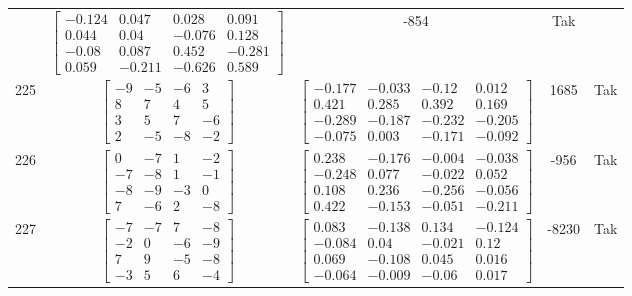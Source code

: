\documentclass[a4paper,12pt]{article}
\begin{document}
\begin{tabular}{c c c c c}
&
$\begin{bmatrix} -0.124 & 0.047 & 0.028 & 0.091 \\ 0.044 & 0.04 & -0.076 & 0.128 \\ -0.08 & 0.087 & 0.452 & -0.281 \\ 0.059 & -0.211 & -0.626 & 0.589 \end{bmatrix}$
&
-854
&
Tak
\\
225
&
$\begin{bmatrix} -9 & -5 & -6 & 3 \\ 8 & 7 & 4 & 5 \\ 3 & 5 & 7 & -6 \\ 2 & -5 & -8 & -2 \end{bmatrix}$
&
$\begin{bmatrix} -0.177 & -0.033 & -0.12 & 0.012 \\ 0.421 & 0.285 & 0.392 & 0.169 \\ -0.289 & -0.187 & -0.232 & -0.205 \\ -0.075 & 0.003 & -0.171 & -0.092 \end{bmatrix}$
&
1685
&
Tak
\\
226
&
$\begin{bmatrix} 0 & -7 & 1 & -2 \\ -7 & -8 & 1 & -1 \\ -8 & -9 & -3 & 0 \\ 7 & -6 & 2 & -8 \end{bmatrix}$
&
$\begin{bmatrix} 0.238 & -0.176 & -0.004 & -0.038 \\ -0.248 & 0.077 & -0.022 & 0.052 \\ 0.108 & 0.236 & -0.256 & -0.056 \\ 0.422 & -0.153 & -0.051 & -0.211 \end{bmatrix}$
&
-956
&
Tak
\\
227
&
$\begin{bmatrix} -7 & -7 & 7 & -8 \\ -2 & 0 & -6 & -9 \\ 7 & 9 & -5 & -8 \\ -3 & 5 & 6 & -4 \end{bmatrix}$
&
$\begin{bmatrix} 0.083 & -0.138 & 0.134 & -0.124 \\ -0.084 & 0.04 & -0.021 & 0.12 \\ 0.069 & -0.108 & 0.045 & 0.016 \\ -0.064 & -0.009 & -0.06 & 0.017 \end{bmatrix}$
&
-8230
&
Tak
\\

\end{tabular}
\end{document}

